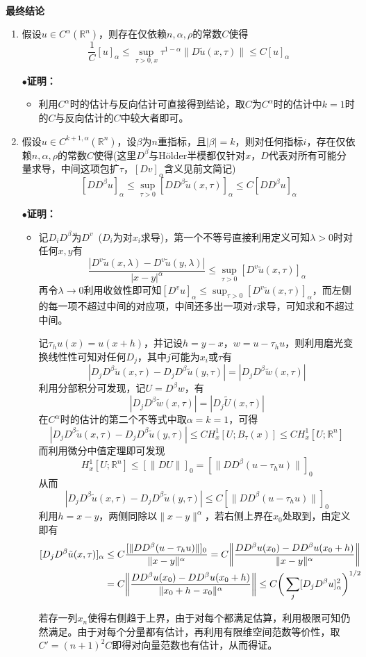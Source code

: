 \documentclass[a4paper,UTF8,fontset=windows,AutoFakeBold]{ctexart}
\newcommand{\proo}[1]{{\kaishu $\bullet$\textbf{证明：}
\begin{itemize}
    \item[] #1
\end{itemize}
}}
\begin{document}
\

\textbf{最终结论}
\begin{enumerate}
    \item 假设$u\in C^\alpha(\mathbb{R}^n)$，则存在仅依赖$n,\alpha,\rho$的常数$C$使得
    $$\frac{1}{C}[u]_\alpha\le\sup_{\tau>0,x}\tau^{1-\alpha}\|D\tilde{u}(x,\tau)\|\le C[u]_\alpha$$
    \proo{
        利用$C^\alpha$时的估计与反向估计可直接得到结论，取$C$为$C^\alpha$时的估计中$k=1$时的$C$与反向估计的$C$中较大者即可。
    }

    \item 假设$u\in C^{k+1,\alpha}(\mathbb{R}^n)$，设$\beta$为$n$重指标，且$|\beta|=k$，则对任何指标$i$，存在仅依赖$n,\alpha,\rho$的常数$C$使得(这里$D^\beta$与H\"older半模都仅针对$x$，$D$代表对所有可能分量求导，中间这项包扩$\tau$，$[Dv]_\alpha$含义见前文简记)
    $$[DD^\beta u]_\alpha\le\sup_{\tau>0}[DD^\beta\tilde{u}(x,\tau)]_\alpha\le C[DD^\beta u]_\alpha$$

    \proo{
        记$D_iD^\beta$为$D^v$\ ($D_i$为对$x_i$求导)，第一个不等号直接利用定义可知$\lambda>0$时对任何$x,y$有
        $$\frac{|D^v\tilde{u}(x,\lambda)-D^v\tilde{u}(y,\lambda)|}{|x-y|^\alpha}\le\sup_{\tau>0}[D^v\tilde{u}(x,\tau)]_\alpha$$
        再令$\lambda\to0$利用收敛性即可知$[D^vu]_\alpha\le\sup_{\tau>0}[D^v\tilde{u}(x,\tau)]_\alpha$，而左侧的每一项不超过中间的对应项，中间还多出一项对$\tau$求导，可知求和不超过中间。

        记$\tau_hu(x)=u(x+h)$，并记设$h=y-x$，$w=u-\tau_hu$，则利用磨光变换线性性可知对任何$D_j$，其中$j$可能为$x_i$或$\tau$有
        $$|D_jD^\beta\tilde{u}(x,\tau)-D_jD^\beta\tilde{u}(y,\tau)|=|D_jD^\beta\tilde{w}(x,\tau)|$$
        利用分部积分可发现，记$U=D^\beta w$，有
        $$|D_jD^\beta\tilde{w}(x,\tau)|=|D_j\tilde{U}(x,\tau)|$$
        在$C^\alpha$时的估计的第二个不等式中取$\alpha=k=1$，可得
        $$|D_jD^\beta\tilde{u}(x,\tau)-D_jD^\beta\tilde{u}(y,\tau)|\le CH_x^1[U;B_\tau(x)]\le CH_x^1[U;\mathbb{R}^n]$$
        而利用微分中值定理即可发现
        $$H_x^1[U;\mathbb{R}^n]\le[\|DU\|]_0=[\|DD^\beta(u-\tau_hu)\|]_0$$
        从而
        $$|D_jD^\beta\tilde{u}(x,\tau)-D_jD^\beta\tilde{u}(y,\tau)|\le C[\|DD^\beta(u-\tau_hu)\|]_0$$
        利用$h=x-y$，两侧同除以$\|x-y\|^\alpha$，若右侧上界在$x_0$处取到，由定义即有
        $$\begin{aligned}\relax[D_jD^\beta\tilde{u}(x,\tau)]_\alpha &\le C\frac{[\|DD^\beta(u-\tau_hu)\|]_0}{\|x-y\|^\alpha}=C\bigg\|\frac{DD^\beta u(x_0)-DD^\beta u(x_0+h)}{\|x-y\|^\alpha}\bigg\|\\ &=C\bigg\|\frac{DD^\beta u(x_0)-DD^\beta u(x_0+h)}{\|x_0+h-x_0\|^\alpha}\bigg\|\le C\bigg(\sum_j[D_jD^\beta u]_\alpha^2\bigg)^{1/2}\end{aligned}$$

        若存一列$x_n$使得右侧趋于上界，由于对每个都满足估算，利用极限可知仍然满足。由于对每个分量都有估计，再利用有限维空间范数等价性，取$C'=(n+1)^2C$即得对向量范数也有估计，从而得证。
    }
\end{enumerate}
\end{document}
